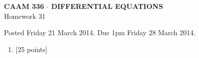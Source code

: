 \documentclass[10pt]{article}
\begin{document}
\vspace*{-5em}
\begin{center}
\large \textsf{\textbf{CAAM 336 $\cdot$ DIFFERENTIAL EQUATIONS}\\[0.5em]
Homework 31 }
\end{center}

Posted Friday 21 March 2014.  Due 1pm Friday 28 March 2014.

\begin{enumerate}\addtocounter{enumi}{30}
\item {[25 points]}  
\end{enumerate}
\end{document}
